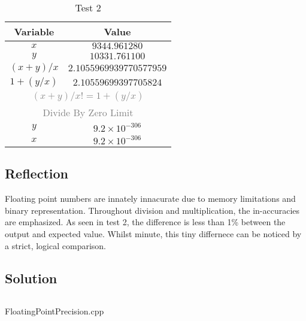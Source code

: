 \documentclass[main.tex]{subfiles}
\begin{document}
            \vspace{1cm}

            \begin{table}[H]
                \centering
                \begin{tabular}{c c}
                    \hline
                    \textbf{Variable} & \textbf{Value} \\
                    \hline
                    \(x\) & \(9344.961280\) \\
                    \(y\) & \(10331.761100\) \\
                    \hline
                    \hline
                    \((x + y) / x\) & \(2.1055969939770577959\) \\
                    \(1 + (y / x)\) & \(2.10559699397705824\) \\
                    \multicolumn{2}{c}{\textcolor{gray}{\((x + y) / x != 1 + ( y / x)\)}} \\
                    \hline
                    \hline
                    \multicolumn{2}{c}{\textcolor{gray}{Divide By Zero Limit}} \\
                    \(y\) & \(9.2 \times 10^{-306}\) \\
                    \(x\) & \(9.2 \times 10^{-306}\) \\
                    \hline
                \end{tabular}
                \caption{Test 2}
            \end{table}

        \subsection{Reflection}
            Floating point numbers are innately innacurate due to memory limitations and binary representation.
            Throughout division and multiplication, the in-accuracies are emphasized. As seen in
            test 2, the difference is less than 1\% between the output and expected value. Whilst minute,
            this tiny differnece can be noticed by a strict, logical comparison. 
        \subsection{Solution}
            \begin{listing}[H]
                \inputminted[firstline=10]{cpp}{../Tasks/04-FloatingPointPrecision/FloatingPointPrecision.cpp}
                \caption{FloatingPointPrecision.cpp}
            \end{listing}
\end{document}
